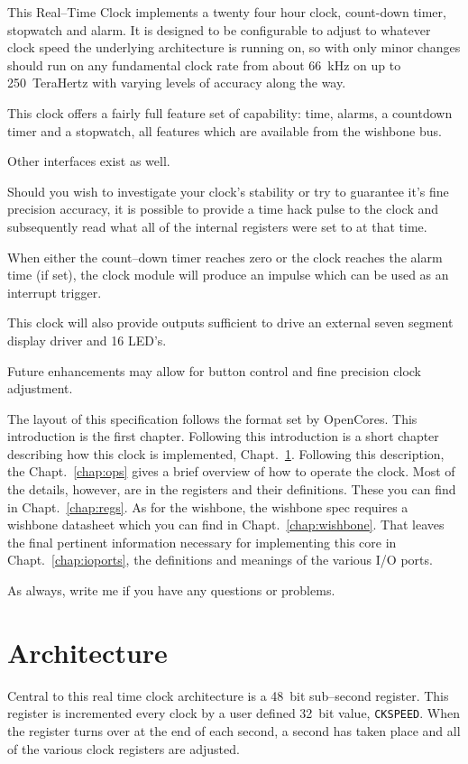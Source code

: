 \documentclass{gqtekspec}
\begin{document}
This Real--Time Clock implements a twenty four hour clock, count-down timer,
stopwatch
and alarm.  It is designed to be configurable to adjust to whatever clock
speed the underlying architecture is running on, so with only minor changes
should run on any fundamental clock rate from about 66~kHz on up to
250~TeraHertz with varying levels of accuracy along the way.  

This clock offers a fairly full feature set of capability: time, alarms,
a countdown timer and a stopwatch, all features which are available from the
wishbone bus.

Other interfaces exist as well. 

Should you wish to investigate your clock's
stability or try to guarantee it's fine precision accuracy, it is possible to
provide a time hack pulse to the clock and subsequently read what all of the
internal registers were set to at that time.

When either the count--down timer reaches zero or the clock reaches the alarm
time (if set), the clock module will produce an impulse which can be used
as an interrupt trigger.

This clock will also provide outputs sufficient to drive an external seven
segment display driver and 16 LED's.

Future enhancements may allow for button control and fine precision clock
adjustment.

The layout of this specification follows the format set by OpenCores.
This introduction is the first chapter.  Following this introduction is
a short chapter describing how this clock is implemented,
Chapt.~\ref{chap:arch}.  Following this description, the Chapt.~\ref{chap:ops}
gives a brief overview of how to operate the clock.  Most of the details,
however, are in the registers and their definitions.  These you can find in
Chapt.~\ref{chap:regs}.  As for the wishbone, the wishbone spec requires a
wishbone datasheet which you can find in Chapt.~\ref{chap:wishbone}.
That leaves the final pertinent information necessary for implementing this
core in Chapt.~\ref{chap:ioports}, the definitions and meanings of the
various I/O ports.

As always, write me if you have any questions or problems.

\chapter{Architecture}\label{chap:arch}

Central to this real time clock architecture is a 48~bit sub--second register.
This register is incremented every clock by a user defined 32~bit value,
{\tt CKSPEED}.
When the register turns over at the end of each second, a second has taken
place and all of the various clock registers are adjusted.
\end{document}
